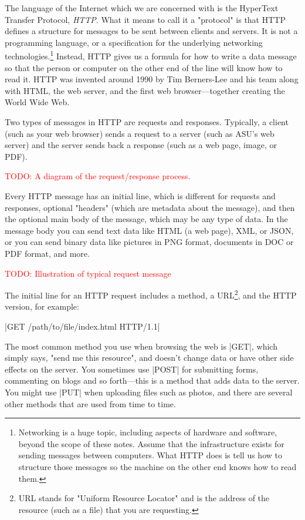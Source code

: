 \documentclass[11pt]{book}
\newcommand{\term}[1]{\emph{#1}} %
\newcommand{\todo}[1]{\textcolor{red}{TODO: #1}} %
\begin{document}
The language of the Internet which we are concerned with is the HyperText Transfer Protocol, \term{HTTP}.  What it means to call it a "protocol" is that HTTP defines a structure for messages to be sent between clients and servers.  It is not a programming language, or a specification for the underlying networking technologies.\footnote{Networking is a huge topic, including aspects of hardware and software, beyond the scope of these notes.  Assume that the infrastructure exists for sending messages between computers.  What HTTP does is tell us how to structure those messages so the machine on the other end knows how to read them.}  Instead, HTTP gives us a formula for how to write a data message so that the person or computer on the other end of the line will know how to read it.  HTTP was invented around 1990 by Tim Berners-Lee and his team along with HTML, the web server, and the first web browser---together creating the World Wide Web.

Two types of messages in HTTP are requests and responses.  Typically, a client (such as your web browser) sends a request to a server (such as ASU's web server) and the server sends back a response (such as a web page, image, or PDF).

\todo{A diagram of the request/response process.}

Every HTTP message has an initial line, which is different for requests and responses, optional "headers" (which are metadata about the message), and then the optional main body of the message, which may be any type of data.  In the message body you can send text data like HTML (a web page), XML, or JSON, or you can send binary data like pictures in PNG format, documents in DOC or PDF format, and more.

\todo{Illustration of typical request message}

The initial line for an HTTP request includes a method, a URL\footnote{URL stands for "Uniform Resource Locator" and is the address of the resource (such as a file) that you are requesting.}, and the HTTP version, for example:

|GET /path/to/file/index.html HTTP/1.1|

The most common method you use when browsing the web is |GET|, which simply says, "send me this resource", and doesn't change data or have other side effects on the server.  You sometimes use |POST| for submitting forms, commenting on blogs and so forth---this is a method that adds data to the server.  You might use |PUT| when uploading files such as photos, and there are several other methods that are used from time to time.
\end{document}
